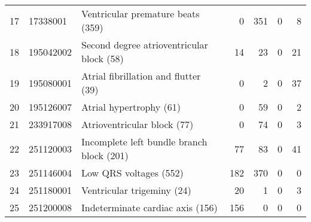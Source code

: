 \begin{tabular}{lllrrrr}
17 & 17338001 & Ventricular premature beats (359) & {\cellcolor[HTML]{EBF3ED}} \color[HTML]{000000} 0 & {\cellcolor[HTML]{2E8B57}} \color[HTML]{F1F1F1} 351 & {\cellcolor[HTML]{EBF3ED}} \color[HTML]{000000} 0 & {\cellcolor[HTML]{E7F1EA}} \color[HTML]{000000} 8 \\
18 & 195042002 & Second degree atrioventricular block (58) & {\cellcolor[HTML]{78B492}} \color[HTML]{F1F1F1} 14 & {\cellcolor[HTML]{2E8B57}} \color[HTML]{F1F1F1} 23 & {\cellcolor[HTML]{EBF3ED}} \color[HTML]{000000} 0 & {\cellcolor[HTML]{3E9464}} \color[HTML]{F1F1F1} 21 \\
19 & 195080001 & Atrial fibrillation and flutter (39) & {\cellcolor[HTML]{EBF3ED}} \color[HTML]{000000} 0 & {\cellcolor[HTML]{E1EDE6}} \color[HTML]{000000} 2 & {\cellcolor[HTML]{EBF3ED}} \color[HTML]{000000} 0 & {\cellcolor[HTML]{2E8B57}} \color[HTML]{F1F1F1} 37 \\
20 & 195126007 & Atrial hypertrophy (61) & {\cellcolor[HTML]{EBF3ED}} \color[HTML]{000000} 0 & {\cellcolor[HTML]{2E8B57}} \color[HTML]{F1F1F1} 59 & {\cellcolor[HTML]{EBF3ED}} \color[HTML]{000000} 0 & {\cellcolor[HTML]{E5EFE9}} \color[HTML]{000000} 2 \\
21 & 233917008 & Atrioventricular block (77) & {\cellcolor[HTML]{EBF3ED}} \color[HTML]{000000} 0 & {\cellcolor[HTML]{2E8B57}} \color[HTML]{F1F1F1} 74 & {\cellcolor[HTML]{EBF3ED}} \color[HTML]{000000} 0 & {\cellcolor[HTML]{E4EEE7}} \color[HTML]{000000} 3 \\
22 & 251120003 & Incomplete left bundle branch block (201) & {\cellcolor[HTML]{3B9262}} \color[HTML]{F1F1F1} 77 & {\cellcolor[HTML]{2E8B57}} \color[HTML]{F1F1F1} 83 & {\cellcolor[HTML]{EBF3ED}} \color[HTML]{000000} 0 & {\cellcolor[HTML]{8EBFA3}} \color[HTML]{000000} 41 \\
23 & 251146004 & Low QRS voltages (552) & {\cellcolor[HTML]{8EC0A4}} \color[HTML]{000000} 182 & {\cellcolor[HTML]{2E8B57}} \color[HTML]{F1F1F1} 370 & {\cellcolor[HTML]{EBF3ED}} \color[HTML]{000000} 0 & {\cellcolor[HTML]{EBF3ED}} \color[HTML]{000000} 0 \\
24 & 251180001 & Ventricular trigeminy (24) & {\cellcolor[HTML]{2E8B57}} \color[HTML]{F1F1F1} 20 & {\cellcolor[HTML]{E2EEE6}} \color[HTML]{000000} 1 & {\cellcolor[HTML]{EBF3ED}} \color[HTML]{000000} 0 & {\cellcolor[HTML]{CFE3D7}} \color[HTML]{000000} 3 \\
25 & 251200008 & Indeterminate cardiac axis (156) & {\cellcolor[HTML]{2E8B57}} \color[HTML]{F1F1F1} 156 & {\cellcolor[HTML]{EBF3ED}} \color[HTML]{000000} 0 & {\cellcolor[HTML]{EBF3ED}} \color[HTML]{000000} 0 & {\cellcolor[HTML]{EBF3ED}} \color[HTML]{000000} 0 \\

\end{tabular}
